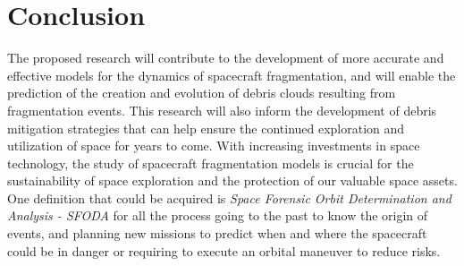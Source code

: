 \documentclass[11pt]{article} %
\begin{document}
\section{Conclusion}

The proposed research will contribute to the development of more accurate and effective models for the dynamics of spacecraft fragmentation, and will enable the prediction of the creation and evolution of debris clouds resulting from fragmentation events. This research will also inform the development of debris mitigation strategies that can help ensure the continued exploration and utilization of space for years to come. With increasing investments in space technology, the study of spacecraft fragmentation models is crucial for the sustainability of space exploration and the protection of our valuable space assets. One definition that could be acquired is \textit{Space Forensic Orbit Determination and Analysis - SFODA} for all the process going to the past to know the origin of events, and planning new missions to predict when and where the spacecraft could be in danger or requiring to execute an orbital maneuver to reduce risks.



\end{document}
